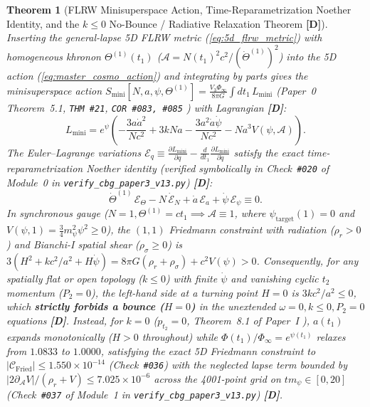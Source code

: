 \documentclass[11pt,a4paper]{article}
\newcommand{\catD}{\textbf{\textcolor{blue!75!black}{[D]}}}
\theoremstyle{plain}
\newtheorem{theorem}{Theorem}[section]
\theoremstyle{definition}
\theoremstyle{remark}
\numberwithin{equation}{section}
\begin{document}
\begin{theorem}[FLRW Minisuperspace Action, Time-Reparametrization Noether Identity, and the $k \le 0$ No-Bounce / Radiative Relaxation Theorem \catD]
\label{thm:flrw_minisuperspace_noether_p3}
Inserting the general-lapse 5D FLRW metric (\ref{eq:5d_flrw_metric}) with homogeneous khronon $\Theta^{(1)}(t_1)$ ($\mathcal{A} = N(t_1)^2 c^2 / (\dot{\Theta}^{(1)})^2$) into the 5D action (\ref{eq:master_cosmo_action}) and integrating by parts gives the minisuperspace action $S_{\text{mini}}[N, a, \psi, \Theta^{(1)}] = \frac{V_3\Phi_{\infty}}{8\pi G}\int dt_1\,L_{\text{mini}}$ (\textit{Paper~0} Theorem~5.1, \texttt{THM \#21}, \texttt{COR \#083, \#085} \cite{jimenez2026_p0}) with Lagrangian \catD:
\begin{equation}
  L_{\text{mini}} = e^{\psi}\left(-\frac{3 a\dot{a}^2}{N c^2} + 3 k N a - \frac{3 a^2\dot{a}\dot{\psi}}{N c^2} - N a^3 V(\psi, \mathcal{A})\right).
  \label{eq:flrw_minisuperspace_L_p3}
\end{equation}
The Euler--Lagrange variations $\mathcal{E}_q \equiv \frac{\partial L_{\text{mini}}}{\partial q} - \frac{d}{dt_1}\frac{\partial L_{\text{mini}}}{\partial\dot{q}}$ satisfy the exact time-reparametrization Noether identity (verified symbolically in Check~\texttt{\#020} of Module~0 in \allowbreak\texttt{verify\_cbg\_paper3\_v13.py}) \catD:
\begin{equation}
  \dot{\Theta}^{(1)}\,\mathcal{E}_{\Theta} - N\,\dot{\mathcal{E}}_N + \dot{a}\,\mathcal{E}_a + \dot{\psi}\,\mathcal{E}_{\psi} \equiv 0.
  \label{eq:flrw_noether_identity_p3}
\end{equation}
In synchronous gauge ($N = 1, \Theta^{(1)} = c t_1 \implies \mathcal{A} \equiv 1$, where $\psi_{\text{target}}(1) = 0$ and $V(\psi,1) = \frac{3}{4}m_{\psi}^2\psi^2 \ge 0$), the $(1,1)$ Friedmann constraint with radiation ($\rho_r > 0$) and Bianchi-I spatial shear ($\rho_{\sigma} \ge 0$) is $3(H^2 + k c^2/a^2 + H\dot{\psi}) = 8\pi G(\rho_r + \rho_{\sigma}) + c^2 V(\psi) > 0$. Consequently, for any spatially flat or open topology ($k \le 0$) with finite $\dot{\psi}$ and vanishing cyclic $t_2$ momentum ($P_2 = 0$), the left-hand side at a turning point $H = 0$ is $3k c^2/a^2 \le 0$, which \textbf{strictly forbids a bounce ($H = 0$)} in the unextended $\omega = 0, k \le 0, P_2 = 0$ equations \catD. Instead, for $k = 0$ ($p_{t_2} = 0$, Theorem~8.1 of \textit{Paper~I} \cite{jimenez2026a}), $a(t_1)$ expands monotonically ($H > 0$ throughout) while $\Phi(t_1)/\Phi_{\infty} = e^{\psi(t_1)}$ relaxes from $1.0833$ to $1.0000$, satisfying the exact 5D Friedmann constraint to $\lvert\mathcal{C}_{\text{Fried}}\rvert \le 1.550 \times 10^{-14}$ (Check~\texttt{\#036}) with the neglected lapse term bounded by $\lvert 2\partial_{\mathcal{A}}V\rvert / (\rho_r + V) \le 7.025 \times 10^{-6}$ across the 4001-point grid on $t m_{\psi} \in [0, 20]$ (Check~\texttt{\#037} of Module~1 in \allowbreak\texttt{verify\_cbg\_paper3\_v13.py}) \catD.
\end{theorem}
\end{document}
